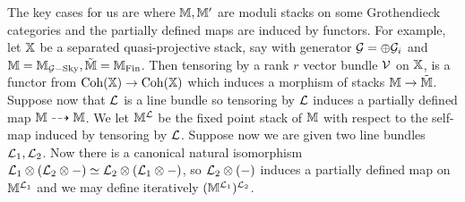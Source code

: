 \documentclass[12pt]{amsart}
\begin{document}
The key cases for us are where $\mathbb{M}, \mathbb{M}'$ are moduli stacks on some Grothendieck categories and the partially defined maps are induced by functors. For example, let $\mathbb{X}$ be a separated quasi-projective stack, say with generator $\mathcal{G} = \oplus \mathcal{G}_i$ and $\mathbb{M} =  \mathbb{M}_{\mathcal{G}-\textup{Sky}}, \tilde{\mathbb{M}} = \mathbb{M}_{\textup{Fin}}$. Then tensoring by a rank $r$ vector bundle $\mathcal{V}$ on $\mathbb{X}$, is a functor from $\operatorname{Coh}(\mathbb{X}) \to \operatorname{Coh}(\mathbb{X})$ which induces a morphism of stacks $\mathbb{M} \to \tilde{\mathbb{M}}$. Suppose now that $\mathcal{L}$ is a line bundle so tensoring by $\mathcal{L}$ induces a partially defined map $\mathbb{M} \dashrightarrow \mathbb{M}$. We let $\mathbb{M}^{\mathcal{L}}$ be the fixed point stack of $\mathbb{M}$ with respect to the self-map induced by tensoring by $\mathcal{L}$. Suppose now we are given two line bundles $\mathcal{L}_1,\mathcal{L}_2$. Now there is a canonical natural isomorphism $\mathcal{L}_1 \otimes (\mathcal{L}_2 \otimes -) \simeq \mathcal{L}_2 \otimes (\mathcal{L}_1 \otimes -)$, so $\mathcal{L}_2 \otimes (-)$ induces a partially defined map on $\mathbb{M}^{\mathcal{L}_1}$ and we may define iteratively $(\mathbb{M}^{\mathcal{L}_1})^{\mathcal{L}_2}$. 
\end{document}
